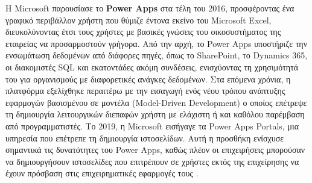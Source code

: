                 Η Microsoft παρουσίασε το \textbf{Power Apps} στα τέλη του 2016, προσφέροντας ένα γραφικό περιβάλλον χρήστη που θύμιζε έντονα εκείνο του Microsoft Excel, διευκολύνοντας έτσι τους χρήστες με βασικές γνώσεις του οικοσυστήματος της εταιρείας να προσαρμοστούν γρήγορα. Από την αρχή, το Power Apps υποστήριζε την ενσωμάτωση δεδομένων από διάφορες πηγές, όπως το SharePoint, το Dynamics 365, οι διακομιστές SQL και εκατοντάδες ακόμη συνδέσεις, ενισχύοντας τη χρησιμότητά του για οργανισμούς με διαφορετικές ανάγκες δεδομένων. Στα επόμενα χρόνια, η πλατφόρμα εξελίχθηκε περαιτέρω με την εισαγωγή ενός νέου τρόπου ανάπτυξης εφαρμογών βασισμένου σε μοντέλα (Model-Driven Development) ο οποίος επέτρεψε τη δημιουργία λειτουργικών διεπαφών χρήστη με ελάχιστη ή και καθόλου παρέμβαση από προγραμματιστές. Το 2019, η Microsoft εισήγαγε τα Power Apps Portals, μια υπηρεσία που επέτρεπε τη δημιουργία ιστοσελίδων. Αυτή η προσθήκη ενίσχυσε σημαντικά τις δυνατότητες του Power Apps, καθώς πλέον οι επιχειρήσεις μπορούσαν να δημιουργήσουν ιστοσελίδες που επιτρέπουν σε χρήστες εκτός της επιχείρησης να έχουν πρόσβαση στις επιχειρηματικές εφαρμογές τους \cite{PowerAppsLeung}.
